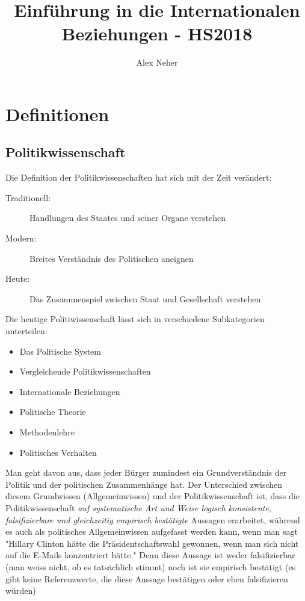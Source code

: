 \documentclass[a4paper, 11pt]{article}
\begin{document}
 
\title{Einführung in die Internationalen Beziehungen - HS2018}
\author{Alex Neher}
\maketitle

\tableofcontents
\newpage
\listoffigures
\newpage

\graphicspath{{./Pictures/}}


\section{Definitionen}
\subsection{Politikwissenschaft}
Die Definition der Politikwissenschaften hat sich mit der Zeit verändert:
\begin{description}
    \item[Traditionell:] Handlungen des Staates und seiner Organe verstehen
    \item[Modern:] Breites Verständnis des Politischen aneignen
    \item[Heute:] Das Zusammenspiel zwischen Staat und Gesellschaft verstehen
\end{description}        

\vspace{10px}
\noindent Die heutige Politiwissenschaft lässt sich in verschiedene Subkategorien unterteilen:
\begin{multicols}{2}
    \begin{itemize}
        \item Das Politische System
        \item Vergleichende Politikwissenschaften
        \item Internationale Beziehungen
\columnbreak
        \item Politische Theorie
        \item Methodenlehre
        \item Politisches Verhalten
    \end{itemize}
\end{multicols}

Man geht davon aus, dass jeder Bürger zumindest ein Grundverständnis der Politik und der politischen Zusammenhänge hat. Der Unterschied zwischen diesem Grundwissen (Allgemeinwissen) und der Politikwissenschaft ist, dass die Politikwissenschaft \textit{auf systematische Art und Weise logisch konsistente, falsifizierbare und gleichzeitig empirisch bestätigte} Aussagen erarbeitet, während es auch als politisches Allgemeinwissen aufgefasst werden kann, wenn man sagt "Hillary Clinton hätte die Präsidentschaftswahl gewonnen, wenn man sich nicht auf die E-Mails konzentriert hätte." Denn diese Aussage ist weder falsifizierbar (man weiss nicht, ob es tatsächlich stimmt) noch ist sie empirisch bestätigt (es gibt keine Referenzwerte, die diese Aussage bestätigen oder eben falsifizieren würden)
\end{document}
